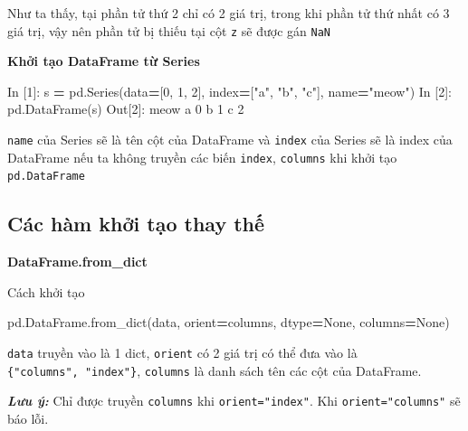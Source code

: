 \documentclass[
]{book}
\makeatletter
\newenvironment{Shaded}{\begin{snugshade}}{\end{snugshade}}
\newcommand{\DecValTok}[1]{\textcolor[rgb]{0.00,0.00,0.81}{#1}}
\newcommand{\NormalTok}[1]{#1}
\newcommand{\OperatorTok}[1]{\textcolor[rgb]{0.81,0.36,0.00}{\textbf{#1}}}
\newcommand{\StringTok}[1]{\textcolor[rgb]{0.31,0.60,0.02}{#1}}
\newcommand{\VariableTok}[1]{\textcolor[rgb]{0.00,0.00,0.00}{#1}}
\newenvironment{kframe}{%
\medskip{}
\setlength{\fboxsep}{.8em}
 \def\at@end@of@kframe{}%
 \ifinner\ifhmode%
  \def\at@end@of@kframe{\end{minipage}}%
  \begin{minipage}{\columnwidth}%
 \fi\fi%
 \def\FrameCommand##1{\hskip\@totalleftmargin \hskip-\fboxsep
 \colorbox{shadecolor}{##1}\hskip-\fboxsep
     \hskip-\linewidth \hskip-\@totalleftmargin \hskip\columnwidth}%
 \MakeFramed {\advance\hsize-\width
   \@totalleftmargin\z@ \linewidth\hsize
   \@setminipage}}%
 {\par\unskip\endMakeFramed%
 \at@end@of@kframe}
\newenvironment{rmdblock}[1]
  {
  \begin{itemize}
  \renewcommand{\labelitemi}{
    \raisebox{-.7\height}[0pt][0pt]{
      {\setkeys{Gin}{width=3em,keepaspectratio}\texttt{[image: images/\#1]}}
    }
  }
  \setlength{\fboxsep}{1em}
  \begin{kframe}
  \item
  }
  {
  \end{kframe}
  \end{itemize}
  }
\newenvironment{rmdnote}
  {\begin{rmdblock}{note}}
  {\end{rmdblock}}
\makeatother
\begin{document}
Như ta thấy, tại phần tử thứ 2 chỉ có 2 giá trị, trong khi phần tử thứ nhất có 3 giá trị, vậy nên phần tử bị thiếu tại cột \texttt{z} sẽ được gán \texttt{NaN}

\textbf{Khởi tạo DataFrame từ Series}

\begin{Shaded}
\begin{Highlighting}[]
\NormalTok{In [}\DecValTok{1}\NormalTok{]: s }\OperatorTok{=}\NormalTok{ pd.Series(data}\OperatorTok{=}\NormalTok{[}\DecValTok{0}\NormalTok{, }\DecValTok{1}\NormalTok{, }\DecValTok{2}\NormalTok{], index}\OperatorTok{=}\NormalTok{[}\StringTok{"a"}\NormalTok{, }\StringTok{"b"}\NormalTok{, }\StringTok{"c"}\NormalTok{], name}\OperatorTok{=}\StringTok{"meow"}\NormalTok{)}
\NormalTok{In [}\DecValTok{2}\NormalTok{]: pd.DataFrame(s)}
\NormalTok{Out[}\DecValTok{2}\NormalTok{]: }
\NormalTok{   meow}
\NormalTok{a     }\DecValTok{0}
\NormalTok{b     }\DecValTok{1}
\NormalTok{c     }\DecValTok{2}
\end{Highlighting}
\end{Shaded}

\texttt{name} của Series sẽ là tên cột của DataFrame và \texttt{index} của Series sẽ là index của DataFrame nếu ta không truyền các biến \texttt{index}, \texttt{columns} khi khởi tạo \texttt{pd.DataFrame}

\hypertarget{cuxe1c-huxe0m-khux1edfi-tux1ea1o-thay-thux1ebf}{%
\subsection{Các hàm khởi tạo thay thế}\label{cuxe1c-huxe0m-khux1edfi-tux1ea1o-thay-thux1ebf}}

\textbf{DataFrame.from\_dict}

Cách khởi tạo

\begin{Shaded}
\begin{Highlighting}[]
\NormalTok{pd.DataFrame.from\_dict(data, orient}\OperatorTok{=}\StringTok{\textquotesingle{}columns\textquotesingle{}}\NormalTok{, dtype}\OperatorTok{=}\VariableTok{None}\NormalTok{, columns}\OperatorTok{=}\VariableTok{None}\NormalTok{)}
\end{Highlighting}
\end{Shaded}

\texttt{data} truyền vào là 1 dict, \texttt{orient} có 2 giá trị có thể đưa vào là \texttt{\{"columns",\ "index"\}}, \texttt{columns} là danh sách tên các cột của DataFrame.

\begin{rmdnote}
\textbf{\emph{Lưu ý:}} Chỉ được truyền \texttt{columns} khi \texttt{orient="index"}. Khi \texttt{orient="columns"} sẽ báo lỗi.
\end{rmdnote}
\end{document}
